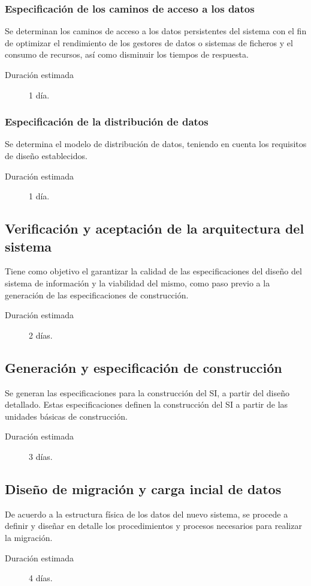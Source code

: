 \documentclass[11pt,a4paper,spanish,twoside]{report}
\begin{document}
\subsubsection{Especificación de los caminos de acceso a los datos}
Se determinan los caminos de acceso a los datos persistentes del sistema con
el fin de optimizar el rendimiento de los gestores de datos o sistemas de
ficheros y el consumo de recursos, así como disminuir los tiempos de
respuesta. 
\begin{description}
\item[Duración estimada] 1 día.
\end{description}

\subsubsection{Especificación de la distribución de datos}
Se determina el modelo de distribución de datos, teniendo en cuenta los
requisitos de diseño establecidos. 
\begin{description}
\item[Duración estimada] 1 día.
\end{description}

\subsection{Verificación y aceptación de la arquitectura del sistema}
Tiene como objetivo el garantizar la calidad de las especificaciones del
diseño del sistema de información y la viabilidad del mismo, como paso previo
a la generación de las especificaciones de construcción. 
\begin{description}
\item[Duración estimada] 2 días.
\end{description}

\subsection{Generación y especificación de construcción}
Se generan las especificaciones para la construcción del SI, a partir del
diseño detallado. Estas especificaciones definen la construcción del SI a
partir de las unidades básicas de construcción. 
\begin{description}
\item[Duración estimada] 3 días.
\end{description}

\subsection{Diseño de migración y carga incial de datos}
De acuerdo a la estructura física de los datos del nuevo sistema, se procede
a definir y diseñar en detalle los procedimientos y procesos necesarios para
realizar la migración. 
\begin{description}
\item[Duración estimada] 4 días.
\end{description}
\end{document}
